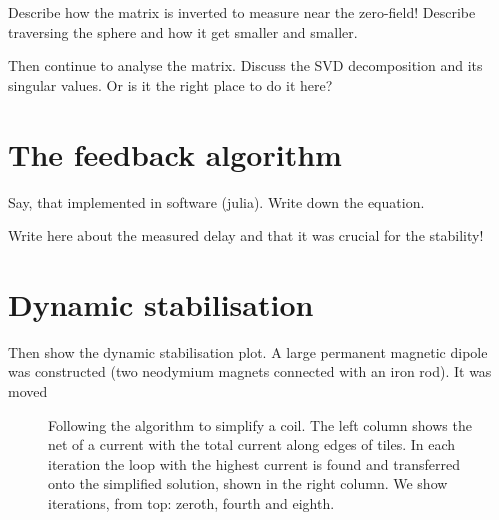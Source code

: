 Describe how the matrix is inverted to measure near the zero-field! Describe traversing the sphere and how it get smaller and smaller.

Then continue to analyse the matrix. Discuss the SVD decomposition and its singular values. Or is it the right place to do it here?


\section{The feedback algorithm}
Say, that implemented in software (julia). Write down the equation.

Write here about the measured delay and that it was crucial for the stability!


\section{Dynamic stabilisation}

Then show the dynamic stabilisation plot. A large permanent magnetic dipole was constructed (two neodymium magnets connected with an iron rod). It was moved

\begin{figure}
  \centering
  \quad
  \caption{Following the algorithm to simplify a coil. The left column shows the net of a current with the total current along edges of tiles. In each iteration the loop with the highest current is found and transferred onto the simplified solution, shown in the right column. We show iterations, from top: zeroth, fourth and eighth.}
  \label{fig:prototype_compensation_time}
\end{figure}


